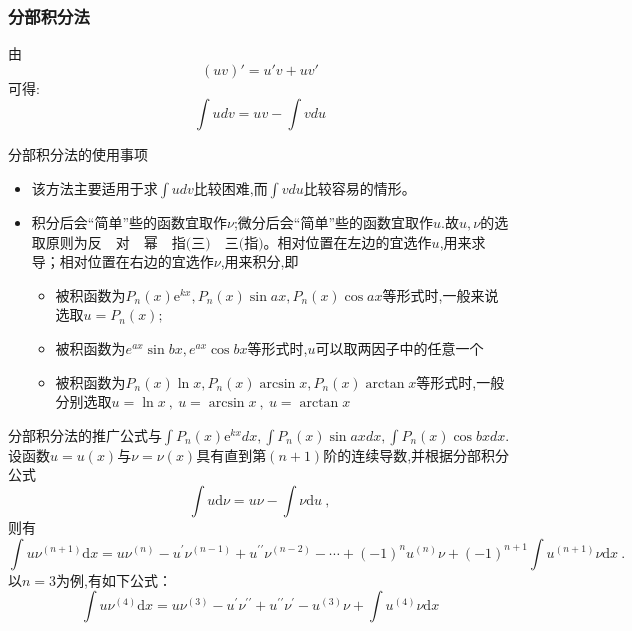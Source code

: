 \documentclass[8pt a4paper, oneside, UTF8]{ctexbook}
\begin{document}
\begin{sloppypar}
    \subsubsection{分部积分法}
    由$$
        (uv)'=u'v+uv'
    $$
    可得:
    $$
        \int u dv =uv -\int v du
    $$
    \begin{criterion}{分部积分法的使用事项}{}
        \begin{itemize}
            \item 该方法主要适用于求$\int u dv $比较困难,而$\int v du $比较容易的情形。
            \item 积分后会“简单”些的函数宜取作$\nu$;微分后会“简单”些的函数宜取作$u$.故$u,\nu$的选取原则为$\text{反} \quad \text{对} \quad \text{幂} \quad \text{指(三)} \quad \text{三(指)}$。相对位置在左边的宜选作$u$,用来求导；相对位置在右边的宜选作$\nu$,用来积分,即
                  \begin{itemize}
                      \item 被积函数为$P_n(x)\mathrm{e}^{kx},P_n(x) \sin ax,P_n(x)\cos ax$等形式时,一般来说选取$u=P_n(x);$
                      \item 被积函数为$e^{ax}\sin bx,e^{ax}\cos bx$等形式时,$u$可以取两因子中的任意一个
                      \item 被积函数为$P_n(x)\ln x,P_n(x)\arcsin x,P_n(x)\arctan x$等形式时,一般分别选取$u=\ln x\:,\:u=\arcsin x\:,\:u=\arctan x$
                  \end{itemize}
        \end{itemize}
    \end{criterion}
    分部积分法的推广公式与$\int P_n(x) \mathrm{e} ^{kx}dx,\int P_n(x) \sin ax dx,\int P_n(x) \cos bx dx.$
    设函数$u=u(x)$与$\nu=\nu(x)$具有直到第$(n+1)$阶的连续导数,并根据分部积分公式
    $$\int u\mathrm{d}\nu=u\nu-\int\nu\mathrm{d}u\:,$$
    则有
    $$\int u\nu^{(n+1)}\mathrm{d}x=u\nu^{(n)}-u^{\prime}\nu^{(n-1)}+u^{\prime\prime}\nu^{(n-2)}-\cdots+(-1)^{n}u^{(n)}\nu+(-1)^{n+1}\int u^{(n+1)}\nu\mathrm{d}x\:.$$
    以$n=3$为例,有如下公式：
    $$
        \int u\nu^{(4)}\mathrm{d}x=u\nu^{(3)}-u^{\prime}\nu^{\prime\prime}+u^{\prime\prime}\nu^{\prime}-u^{(3)}\nu+\int u^{(4)}\nu\mathrm{d}x
    $$

\end{sloppypar}
\end{document}
